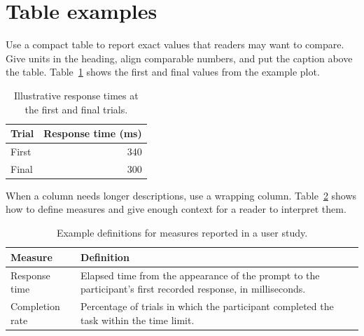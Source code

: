 \section{Table examples}

Use a compact table to report exact values that readers may want to compare.
Give units in the heading, align comparable numbers, and put the caption
above the table. Table~\ref{tab:example-values} shows the first and final
values from the example plot.

\begin{table}[htbp]
  \centering
  \caption{Illustrative response times at the first and final trials.}
  \label{tab:example-values}
  \begin{tabular}{lr}
    \toprule
    Trial & Response time (ms) \\
    \midrule
    First & 340 \\
    Final & 300 \\
    \bottomrule
  \end{tabular}
\end{table}

When a column needs longer descriptions, use a wrapping column.
Table~\ref{tab:example-measures} shows how to define measures and give
enough context for a reader to interpret them.

\begin{table}[htbp]
  \centering
  \caption{Example definitions for measures reported in a user study.}
  \label{tab:example-measures}
  \begin{tabularx}{\linewidth}{lX}
    \toprule
    Measure & Definition \\
    \midrule
    Response time & Elapsed time from the appearance of the prompt to the
      participant's first recorded response, in milliseconds. \\
    Completion rate & Percentage of trials in which the participant completed
      the task within the time limit. \\
    \bottomrule
  \end{tabularx}
\end{table}
